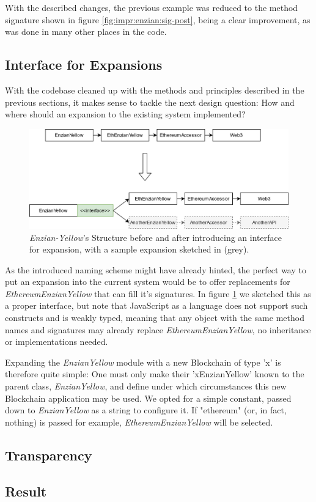 With the described changes, the previous example was reduced to the method signature shown in figure \ref{fig:impr:enzian:sig-post}, being a clear improvement, as was done in many other places in the code.

\subsection{Interface for Expansions}
\label{sec:impr:enzian:exp}

With the codebase cleaned up with the methods and principles described in the previous sections, it makes sense to tackle the next design question: How and where should an expansion to the existing system implemented?

\begin{figure}[h]
	\centering
	\captionsetup{justification=centering,margin=2cm}
	\includegraphics[width=\textwidth]{gfx/enzian-expansion}
	\caption{\emph{Enzian-Yellow}'s Structure before and after introducing an interface for expansion, with a sample expansion sketched in (grey).}
	\label{fig:impr:enzian:expansion}
\end{figure}

As the introduced naming scheme might have already hinted, the perfect way to put an expansion into the current system would be to offer replacements for \emph{EthereumEnzianYellow} that can fill it's signatures. In figure \ref{fig:impr:enzian:expansion} we sketched this as a proper interface, but note that JavaScript as a language does not support such constructs and is weakly typed, meaning that any object with the same method names and signatures may already replace \emph{EthereumEnzianYellow}, no inheritance or implementations needed.

Expanding the \emph{EnzianYellow} module with a new Blockchain of type 'x' is therefore quite simple: One must only make their 'xEnzianYellow' known to the parent class, \emph{EnzianYellow}, and define under which circumstances this new Blockchain application may be used. We opted for a simple constant, passed down to \emph{EnzianYellow} as a string to configure it. If "ethereum" (or, in fact, nothing) is passed for example, \emph{EthereumEnzianYellow} will be selected.

\subsection{Transparency}
\label{sec:impr:enzian:log}



\subsection{Result}
\label{sec:impr:enzian:result}